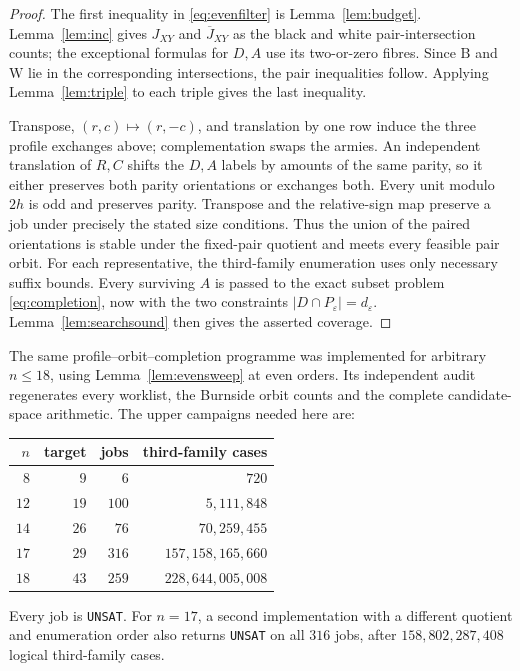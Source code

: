 \documentclass[11pt]{amsart}
\theoremstyle{definition}
\theoremstyle{remark}
\newcommand{\Bl}{\mathrm{B}}
\newcommand{\Wh}{\mathrm{W}}
\begin{document}
\begin{proof}
The first inequality in \eqref{eq:evenfilter} is Lemma~\ref{lem:budget}.
Lemma~\ref{lem:inc} gives \(J_{XY}\) and \(\overline J_{XY}\) as the black
and white pair-intersection counts; the exceptional formulas for \(D,A\)
use its two-or-zero fibres.  Since \(\Bl\) and \(\Wh\) lie in the
corresponding intersections, the pair inequalities follow.  Applying
Lemma~\ref{lem:triple} to each triple gives the last inequality.

Transpose, \((r,c)\mapsto(r,-c)\), and translation by one row induce the
three profile exchanges above; complementation swaps the armies.  An
independent translation of \(R,C\) shifts the \(D,A\) labels by amounts of
the same parity, so it either preserves both parity orientations or
exchanges both.  Every unit modulo \(2h\) is odd and preserves parity.
Transpose and the relative-sign map preserve a job under precisely the
stated size conditions.  Thus the union of the paired orientations is
stable under the fixed-pair quotient and meets every feasible pair orbit.
For each representative, the third-family enumeration uses only necessary
suffix bounds.  Every surviving \(A\) is passed to the exact subset problem
\eqref{eq:completion}, now with the two constraints
\(|D\cap P_\varepsilon|=d_\varepsilon\).  Lemma~\ref{lem:searchsound} then
gives the asserted coverage.
\end{proof}

The same profile--orbit--completion programme was implemented for arbitrary
\(n\le18\), using Lemma~\ref{lem:evensweep} at even orders.  Its independent
audit regenerates every worklist, the Burnside orbit counts and the complete
candidate-space arithmetic.  The upper campaigns needed here are:
\begin{center}
\begin{tabular}{@{}rrrr@{}}
\toprule
$n$ & target & jobs & third-family cases\\
\midrule
$8$  & $9$  & $6$   & $720$\\
$12$ & $19$ & $100$ & $5{,}111{,}848$\\
$14$ & $26$ & $76$  & $70{,}259{,}455$\\
$17$ & $29$ & $316$ & $157{,}158{,}165{,}660$\\
$18$ & $43$ & $259$ & $228{,}644{,}005{,}008$\\
\bottomrule
\end{tabular}
\end{center}
Every job is \texttt{UNSAT}.  For $n=17$, a second implementation with a
different quotient and enumeration order also returns \texttt{UNSAT} on all
$316$ jobs, after $158{,}802{,}287{,}408$ logical third-family cases.
\end{document}
